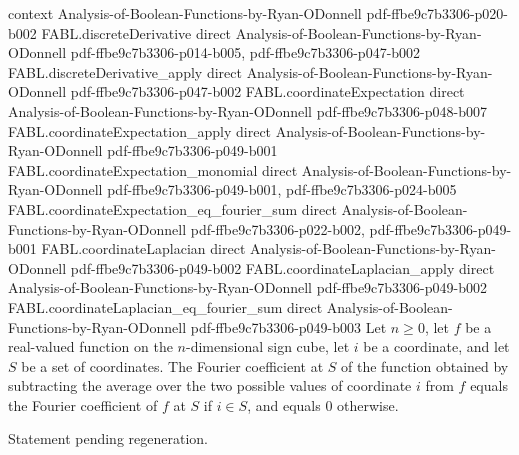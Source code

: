 \begin{theorem}
  {context}
  {Analysis-of-Boolean-Functions-by-Ryan-ODonnell}
  {pdf-ffbe9c7b3306-p020-b002}
\proofstep
  {FABL.discreteDerivative}
  {direct}
  {Analysis-of-Boolean-Functions-by-Ryan-ODonnell}
  {pdf-ffbe9c7b3306-p014-b005,
    pdf-ffbe9c7b3306-p047-b002}
\proofstep
  {FABL.discreteDerivative_apply}
  {direct}
  {Analysis-of-Boolean-Functions-by-Ryan-ODonnell}
  {pdf-ffbe9c7b3306-p047-b002}
\proofstep
  {FABL.coordinateExpectation}
  {direct}
  {Analysis-of-Boolean-Functions-by-Ryan-ODonnell}
  {pdf-ffbe9c7b3306-p048-b007}
\proofstep
  {FABL.coordinateExpectation_apply}
  {direct}
  {Analysis-of-Boolean-Functions-by-Ryan-ODonnell}
  {pdf-ffbe9c7b3306-p049-b001}
\proofstep
  {FABL.coordinateExpectation_monomial}
  {direct}
  {Analysis-of-Boolean-Functions-by-Ryan-ODonnell}
  {pdf-ffbe9c7b3306-p049-b001,
    pdf-ffbe9c7b3306-p024-b005}
\proofstep
  {FABL.coordinateExpectation_eq_fourier_sum}
  {direct}
  {Analysis-of-Boolean-Functions-by-Ryan-ODonnell}
  {pdf-ffbe9c7b3306-p022-b002,
    pdf-ffbe9c7b3306-p049-b001}
\proofstep
  {FABL.coordinateLaplacian}
  {direct}
  {Analysis-of-Boolean-Functions-by-Ryan-ODonnell}
  {pdf-ffbe9c7b3306-p049-b002}
\proofstep
  {FABL.coordinateLaplacian_apply}
  {direct}
  {Analysis-of-Boolean-Functions-by-Ryan-ODonnell}
  {pdf-ffbe9c7b3306-p049-b002}
\proofstep
  {FABL.coordinateLaplacian_eq_fourier_sum}
  {direct}
  {Analysis-of-Boolean-Functions-by-Ryan-ODonnell}
  {pdf-ffbe9c7b3306-p049-b003}
Let $n\ge 0$, let $f$ be a real-valued function on the $n$-dimensional sign cube, let
$i$ be a coordinate, and let $S$ be a set of coordinates. The Fourier coefficient at $S$
of the function obtained by subtracting the average over the two possible values of
coordinate $i$ from $f$ equals the Fourier coefficient of $f$ at $S$ if $i\in S$, and
equals $0$ otherwise.
\end{theorem}

\begin{theorem}
\label{FABL.uniformInner_coordinateLaplacian_self_eq_influence}
\leanok
{}
Statement pending regeneration.
\end{theorem}

